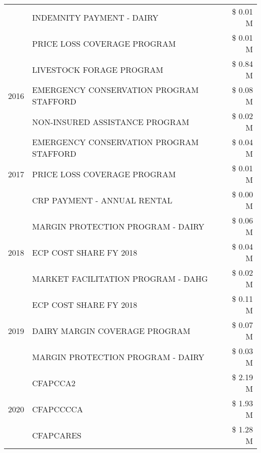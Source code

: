 \begin{tabular}{llr}
 & INDEMNITY PAYMENT - DAIRY & \$ 0.01 M \\
 & PRICE LOSS COVERAGE PROGRAM & \$ 0.01 M \\
\cline{1-3}
\multirow[t]{3}{*}{2016} & LIVESTOCK FORAGE PROGRAM & \$ 0.84 M \\
 & EMERGENCY CONSERVATION PROGRAM STAFFORD & \$ 0.08 M \\
 & NON-INSURED ASSISTANCE PROGRAM & \$ 0.02 M \\
\cline{1-3}
\multirow[t]{3}{*}{2017} & EMERGENCY CONSERVATION PROGRAM STAFFORD & \$ 0.04 M \\
 & PRICE LOSS COVERAGE PROGRAM & \$ 0.01 M \\
 & CRP PAYMENT - ANNUAL RENTAL & \$ 0.00 M \\
\cline{1-3}
\multirow[t]{3}{*}{2018} & MARGIN PROTECTION PROGRAM - DAIRY & \$ 0.06 M \\
 & ECP COST SHARE FY 2018 & \$ 0.04 M \\
 & MARKET FACILITATION PROGRAM - DAHG & \$ 0.02 M \\
\cline{1-3}
\multirow[t]{3}{*}{2019} & ECP COST SHARE FY 2018 & \$ 0.11 M \\
 & DAIRY MARGIN COVERAGE PROGRAM & \$ 0.07 M \\
 & MARGIN PROTECTION PROGRAM - DAIRY & \$ 0.03 M \\
\cline{1-3}
\multirow[t]{3}{*}{2020} & CFAPCCA2 & \$ 2.19 M \\
 & CFAPCCCCA & \$ 1.93 M \\
 & CFAPCARES & \$ 1.28 M \\
\cline{1-3}
\bottomrule
\end{tabular}
